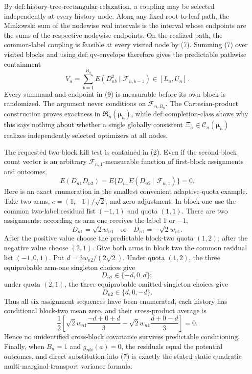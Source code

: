By \(\mathrm{def:history\text{-}tree\text{-}rectangular\text{-}relaxation}\), a coupling may be selected independently at every history node. Along any fixed root-to-leaf path, the Minkowski sum of the nodewise real intervals is the interval whose endpoints are the sums of the respective nodewise endpoints. On the realized path, the common-label coupling is feasible at every visited node by (7). Summing (7) over visited blocks and using \(\mathrm{def:qv\text{-}envelope}\) therefore gives the predictable pathwise containment
\[
V_n=\sum_{b=1}^{B_n}E(D_{nb}^2\mid\mathcal F_{n,b-1})\in[L_n,U_n].
\tag{9}
\]
Every summand and endpoint in (9) is measurable before its own block is randomized. The argument never conditions on \(\mathcal F_{n,B_n}\). The Cartesian-product construction proves exactness in \(\mathfrak R_n(\boldsymbol\mu_n)\), while \(\mathrm{def:completion\text{-}class}\) shows why this says nothing about whether a single globally consistent \(\Xi_n\in\mathcal C_n(\boldsymbol\mu_n)\) realizes independently selected optimizers at all nodes.

The requested two-block kill test is contained in (2). Even if the second-block count vector is an arbitrary \(\mathcal F_{n,1}\)-measurable function of first-block assignments and outcomes,
\[
E(D_{n1}D_{n2})
=E\{D_{n1}E(D_{n2}\mid\mathcal F_{n,1})\}=0.
\tag{10}
\]
Here is an exact enumeration in the smallest convenient adaptive-quota example. Take two arms, \(c=(1,-1)/\sqrt2\), and zero adjustment. In block one use the common two-label residual list \((-1,1)\) and quota \((1,1)\). There are two assignments: according as arm one receives the label \(1\) or \(-1\),
\[
D_{n1}=\sqrt2w_{n1}\quad\text{or}\quad D_{n1}=-\sqrt2w_{n1}.
\]
After the positive value choose the predictable block-two quota \((1,2)\); after the negative value choose \((2,1)\). Give both arms in block two the common residual list \((-1,0,1)\). Put \(d=3w_{n2}/(2\sqrt2)\). Under quota \((1,2)\), the three equiprobable arm-one singleton choices give
\[
D_{n2}\in\{-d,0,d\};
\]
under quota \((2,1)\), the three equiprobable omitted-singleton choices give
\[
D_{n2}\in\{d,0,-d\}.
\]
Thus all six assignment sequences have been enumerated, each history has conditional block-two mean zero, and their cross-product average is
\[
\frac12\left[\sqrt2w_{n1}\frac{-d+0+d}{3}
-\sqrt2w_{n1}\frac{d+0-d}{3}\right]=0.
\tag{11}
\]
Hence no unidentified cross-block covariance survives predictable conditioning. Finally, when \(B_n=1\) and \(g_{nbi}(a)=0\), the residuals equal the potential outcomes, and direct substitution into (7) is exactly the stated static quadratic multi-marginal-transport variance formula.